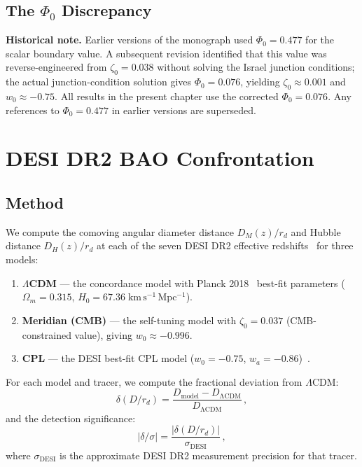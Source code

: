 \subsection{The $\Phi_0$ Discrepancy}
\label{sec:2-Phi0-note}

\textbf{Historical note.} Earlier versions of the monograph used $\Phi_0 = 0.477$ for the scalar boundary value. A subsequent revision identified that this value was reverse-engineered from $\zeta_0 = 0.038$ without solving the Israel junction conditions; the actual junction-condition solution gives $\Phi_0 = 0.076$, yielding $\zeta_0 \approx 0.001$ and $w_0 \approx -0.75$. All results in the present chapter use the corrected $\Phi_0 = 0.076$. Any references to $\Phi_0 = 0.477$ in earlier versions are superseded.

\section{DESI DR2 BAO Confrontation}
\label{sec:2-DESI}

\subsection{Method}
\label{sec:2-DESI-method}

We compute the comoving angular diameter distance $D_M(z)/r_d$ and Hubble distance $D_H(z)/r_d$ at each of the seven DESI DR2 effective redshifts~\cite{ch2:DESIDR2} for three models:
\begin{enumerate}
    \item \textbf{$\Lambda$CDM} --- the concordance model with Planck 2018~\cite{ch2:Planck2018} best-fit parameters ($\Omega_m = 0.315$, $H_0 = 67.36\;\mathrm{km\,s^{-1}\,Mpc^{-1}}$).
    \item \textbf{Meridian (CMB)} --- the self-tuning model with $\zeta_0 = 0.037$ (CMB-constrained value), giving $w_0 \approx -0.996$.
    \item \textbf{CPL} --- the DESI best-fit CPL model ($w_0 = -0.75$, $w_a = -0.86$)~\cite{ch2:DESIDR2}.
\end{enumerate}

For each model and tracer, we compute the fractional deviation from $\Lambda$CDM:
\begin{equation}
\delta(D/r_d) = \frac{D_\mathrm{model} - D_\mathrm{\Lambda CDM}}{D_\mathrm{\Lambda CDM}}\,,
\label{eq:2-delta}
\end{equation}
and the detection significance:
\begin{equation}
|\delta/\sigma| = \frac{|\delta(D/r_d)|}{\sigma_\mathrm{DESI}}\,,
\label{eq:2-significance}
\end{equation}
where $\sigma_\mathrm{DESI}$ is the approximate DESI DR2 measurement precision for that tracer.

